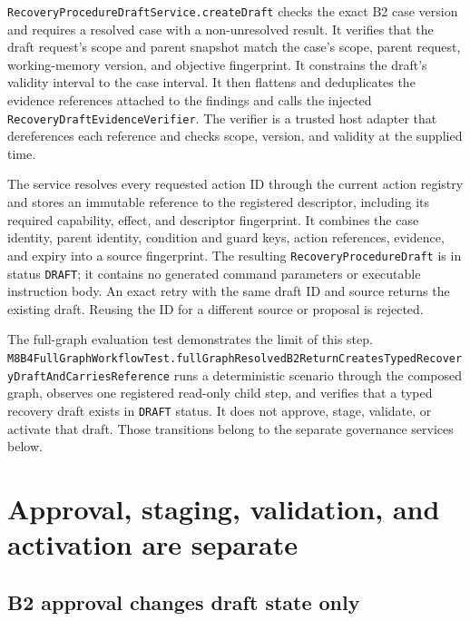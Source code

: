 \texttt{Recovery\allowbreak Procedure\allowbreak Draft\allowbreak Service.\allowbreak create\allowbreak Draft} checks the exact B2 case version and requires a resolved case with a non-unresolved result. It verifies that the draft request's scope and parent snapshot match the case's scope, parent request, working-memory version, and objective fingerprint. It constrains the draft's validity interval to the case interval. It then flattens and deduplicates the evidence references attached to the findings and calls the injected \texttt{Recovery\allowbreak Draft\allowbreak Evidence\allowbreak Verifier}. The verifier is a trusted host adapter that dereferences each reference and checks scope, version, and validity at the supplied time.

The service resolves every requested action ID through the current action registry and stores an immutable reference to the registered descriptor, including its required capability, effect, and descriptor fingerprint. It combines the case identity, parent identity, condition and guard keys, action references, evidence, and expiry into a source fingerprint. The resulting \texttt{Recovery\allowbreak Procedure\allowbreak Draft} is in status \texttt{DRAFT}; it contains no generated command parameters or executable instruction body. An exact retry with the same draft ID and source returns the existing draft. Reusing the ID for a different source or proposal is rejected.

The full-graph evaluation test demonstrates the limit of this step. \texttt{M8\allowbreak B4\allowbreak Full\allowbreak Graph\allowbreak Workflow\allowbreak Test.\allowbreak full\allowbreak Graph\allowbreak Resolved\allowbreak B2\allowbreak Return\allowbreak Creates\allowbreak Typed\allowbreak Recovery\allowbreak Draft\allowbreak And\allowbreak Carries\allowbreak Reference} runs a deterministic scenario through the composed graph, observes one registered read-only child step, and verifies that a typed recovery draft exists in \texttt{DRAFT} status. It does not approve, stage, validate, or activate that draft. Those transitions belong to the separate governance services below.

\section{Approval, staging, validation, and activation are separate}
\label{sec:ch22-procedure-governance}

\subsection{B2 approval changes draft state only}
\label{subsec:ch22-b2-approval}

